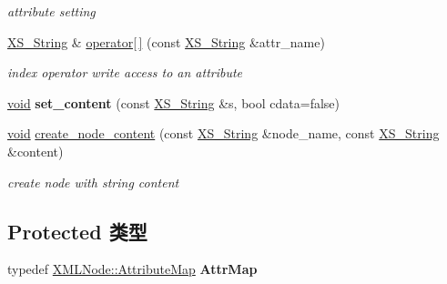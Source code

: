 \begin{DoxyCompactItemize}
\begin{DoxyCompactList}\small\item\em attribute setting \end{DoxyCompactList}\item 
\mbox{\label{struct_x_m_l_storage_1_1_x_m_l_writer_a8a442cc5c3d4b885afba4aac5a9bcc1f}} 
\hyperlink{struct_x_m_l_storage_1_1_x_s___string}{X\+S\+\_\+\+String} \& \hyperlink{struct_x_m_l_storage_1_1_x_m_l_writer_a8a442cc5c3d4b885afba4aac5a9bcc1f}{operator\mbox{[}$\,$\mbox{]}} (const \hyperlink{struct_x_m_l_storage_1_1_x_s___string}{X\+S\+\_\+\+String} \&attr\+\_\+name)
\begin{DoxyCompactList}\small\item\em index operator write access to an attribute \end{DoxyCompactList}\item 
\mbox{\label{struct_x_m_l_storage_1_1_x_m_l_writer_ab216ecd157ce46b8ee23a2492efbe632}} 
\hyperlink{interfacevoid}{void} {\bfseries set\+\_\+content} (const \hyperlink{struct_x_m_l_storage_1_1_x_s___string}{X\+S\+\_\+\+String} \&s, bool cdata=false)
\item 
\mbox{\label{struct_x_m_l_storage_1_1_x_m_l_writer_adb448cf14758cff2f66e93ee3d377eee}} 
\hyperlink{interfacevoid}{void} \hyperlink{struct_x_m_l_storage_1_1_x_m_l_writer_adb448cf14758cff2f66e93ee3d377eee}{create\+\_\+node\+\_\+content} (const \hyperlink{struct_x_m_l_storage_1_1_x_s___string}{X\+S\+\_\+\+String} \&node\+\_\+name, const \hyperlink{struct_x_m_l_storage_1_1_x_s___string}{X\+S\+\_\+\+String} \&content)
\begin{DoxyCompactList}\small\item\em create node with string content \end{DoxyCompactList}\end{DoxyCompactItemize}
\subsection*{Protected 类型}
\begin{DoxyCompactItemize}
\item 
\mbox{\label{struct_x_m_l_storage_1_1_x_m_l_writer_a72c48e48c3e32a5c1c6254f79b03604a}} 
typedef \hyperlink{struct_x_m_l_storage_1_1_x_m_l_node_1_1_attribute_map}{X\+M\+L\+Node\+::\+Attribute\+Map} {\bfseries Attr\+Map}
\end{DoxyCompactItemize}
